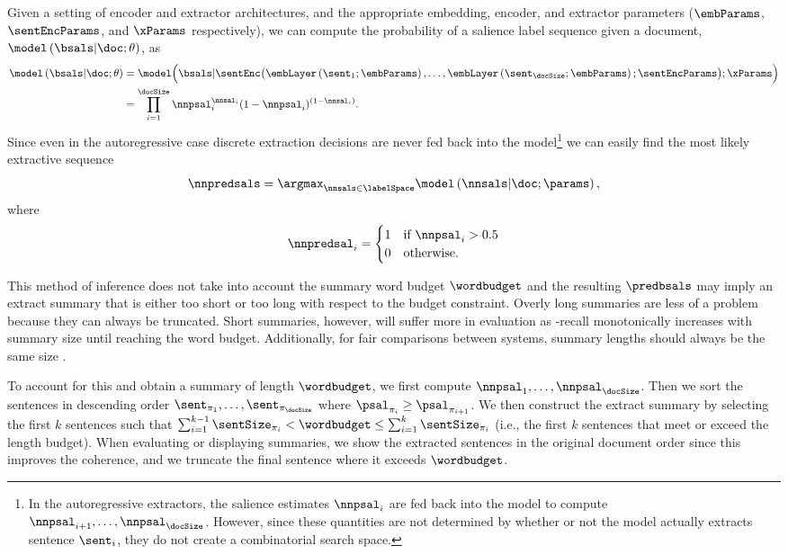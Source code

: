 Given a setting of encoder and extractor architectures, and the appropriate
embedding, encoder, and extractor parameters ($\embParams$, $\sentEncParams$,
and $\xParams$ respectively), we can compute the probability of a salience
label sequence given a document, $\model\left(\bsals|\doc;\theta\right)$, as 
\begin{align*}
\model\left(\bsals|\doc;\theta\right) &= \model\Big(\bsals|
\sentEnc\big(\embLayer\left(\sent_1;\embParams\right),\ldots,\embLayer\left(\sent_\docSize;\embParams\right)  ;\sentEncParams\big);\xParams\Big) \\
    & = \prod_{i=1}^\docSize \nnpsal_i^{\nnsal_i} (1 - \nnpsal_i)^{(1- \nnsal_i)}.
\end{align*}
Since even in the autoregressive case discrete extraction decisions are never
fed back into the model\footnote{In the autoregressive extractors, the salience
estimates $\nnpsal_i$ are fed back into the model to compute
$\nnpsal_{i+1},\ldots, \nnpsal_\docSize$. However, since these quantities are
not determined by whether or not the model actually extracts sentence
$\sent_i$, they do not create a combinatorial search space.} we can easily find
the most likely extractive sequence 
\[ \nnpredsals = \argmax_{\nnsals\in\labelSpace} \model\left(\nnsals|\doc;\params\right),
\] 
where 
\[\nnpredsal_i = \begin{cases}
       1 & \textrm{if $\nnpsal_i > 0.5$} \\ 0 & \textrm{otherwise}. 
\end{cases}
\]

This method of inference does not take into account the summary word budget
$\wordbudget$ and the resulting $\predbsals$ may imply an extract summary that
is either too short or too long with respect to the budget constraint. Overly
long summaries are less of a problem because they can always be truncated.
Short summaries, however, will suffer more in evaluation as \rouge-recall
monotonically increases with summary size until reaching the word budget.
Additionally, for fair comparisons between systems, summary lengths should
always be the same size \citep{napoles2011}.

To account for this and obtain a summary of length $\wordbudget$, we first
compute $\nnpsal_1,\ldots,\nnpsal_\docSize$. Then we sort the sentences  in
descending order $\sent_{\pi_1}, \ldots, \sent_{\pi_\docSize}$ where
$\psal_{\pi_i} \ge \psal_{\pi_{i+1}}$. We then construct the extract summary by
selecting the first $k$ sentences such that $\sum_{i=1}^{k-1} \sentSize_{\pi_i}
< \wordbudget \le \sum_{i=1}^{k} \sentSize_{\pi_i}$ (i.e., the first $k$
sentences that  meet or exceed the length budget). When evaluating or
displaying summaries, we show the extracted sentences in the original document
order since this improves the coherence, and we truncate the final sentence
where it exceeds $\wordbudget$.
